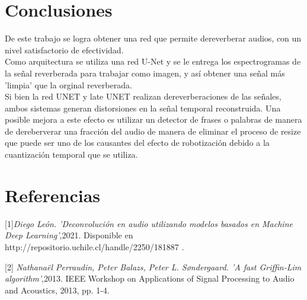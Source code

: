\section{Conclusiones}

De este trabajo se logra obtener una red que permite dereverberar audios, con un nivel satisfactorio de efectividad. \\


Como arquitectura se utiliza una red U-Net y se le entrega los espectrogramas de la señal reverberada para trabajar como imagen, y así obtener una señal más 'limpia' que la orginal reverberada. \\


Si bien la red UNET y late UNET realizan dereverberaciones de las señales, ambos sistemas generan distorsiones en la señal temporal reconstruida. Una posible mejora a este efecto es utilizar un detector de frases o palabras de manera de dereberverar una fracción del audio de manera de eliminar el proceso de resize que puede ser uno de los causantes del efecto de robotización debido a la cuantización temporal que se utiliza.



\section*{Referencias}
[1]\emph{Diego León. 'Deconvolución en audio utilizando modelos basados en Machine Deep Learning'},2021. Disponible en http://repositorio.uchile.cl/handle/2250/181887 .\label{bib:mem_dconv}

[2] \emph{Nathanaël Perraudin, Peter Balazs, Peter L. Søndergaard. 'A fast Griffin-Lim algorithm'},2013. IEEE Workshop on Applications of Signal Processing to Audio and Acoustics, 2013, pp. 1-4.

